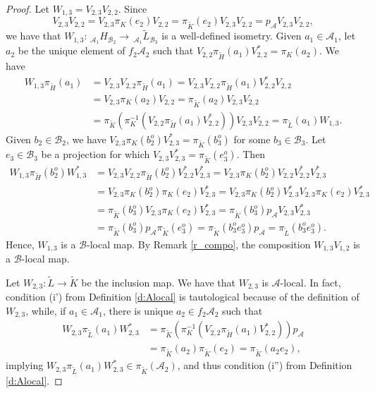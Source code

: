 \documentclass[11pt]{amsart}
\theoremstyle{definition}
\newcommand{\cl}[1]{\mathcal{#1}}
\providecommand{\wt}[1]{\widetilde{#1}}
\begin{document}
\begin{proof}
Let $W_{1,3} = V_{2,3}V_{2,2}$.
Since
$$V_{2,3}V_{2,2}=V_{2,3}\pi_{K}(e_2)V_{2,2}=\pi_{\wt{K}}(e_2)V_{2,3}V_{2,2}=p_\cl{A}V_{2,3}V_{2,2},$$
we have that 
$W_{1,3}: \, _{\cl{A}_1}H_{\cl{B}_2}\to \, _{\cl{A}_1}\wt{L}_{\cl{B}_3}$ is a well-defined isometry. 
Given $a_1\in \cl{A}_1$, 
let $a_2$ be the unique element of $f_2\cl{A}_2$ such that 
$V_{2,2}\pi_{\wt{H}}(a_1)V_{2,2}^*=\pi_{K}(a_2)$. We have 
\begin{align*}
W_{1,3}\pi_{\wt{H}}(a_1)
&=
V_{2,3}V_{2,2}\pi_{\wt{H}}(a_1)
=V_{2,3}V_{2,2}\pi_{\wt{H}}(a_1)V_{2,2}^*V_{2,2}\\
&=V_{2,3}\pi_{K}(a_2)V_{2,2}
=\pi_{\wt{K}}(a_2)V_{2,3}V_{2,2}\\
&=\pi_{\wt{K}}(\pi_K^{-1}(V_{2,2}\pi_{\wt{H}}(a_1)V_{2,2}^*))V_{2,3}V_{2,2}
=\pi_{\wt{L}}(a_1)W_{1,3}.
\end{align*}
Given $b_2\in \cl{B}_2$, we have $V_{2,3}\pi_{K}(b_2^o)V_{2,3}^*=\pi_{\wt{K}}(b_3^o)$ for some $b_3\in \cl{B}_3$. Let $e_3\in \cl{B}_3$ be a projection for which $V_{2,3}V_{2,3}^*=\pi_{\wt{K}}(e_3^o)$. Then
\begin{align*}
W_{1,3}\pi_{\wt{H}}(b_2^o)W_{1,3}^*
&=V_{2,3}V_{2,2}\pi_{\wt{H}}(b_2^o)V_{2,2}^*V_{2,3}^*
=V_{2,3}\pi_{K}(b_2^o)V_{2,2}V_{2,2}^*V_{2,3}^*\\
&=V_{2,3}\pi_{K}(b_2^o)\pi_{K}(e_2)V_{2,3}^*
=V_{2,3}\pi_{K}(b_2^o)V_{2,3}^*V_{2,3}\pi_{K}(e_2)V_{2,3}^*\\
&=\pi_{\wt{K}}(b_3^o)V_{2,3}\pi_{K}(e_2)V_{2,3}^*
=\pi_{\wt{K}}(b_3^o)p_\cl{A}V_{2,3}V_{2,3}^*\\
&=\pi_{\wt{K}}(b_3^o)p_\cl{A}\pi_{\wt{K}}(e_3^o)
=\pi_{\wt{K}}(b_3^oe_3^o)p_\cl{A}
=\pi_{\wt{L}}(b_3^oe_3^o).
\end{align*}
Hence, $W_{1,3}$ is a $\cl{B}$-local map.
By Remark \ref{r_compo}, the composition $W_{1,3} V_{1,2}$ is a 
$\cl{B}$-local map. 

Let $W_{2,3} : \wt{L} \to \wt{K}$ be the inclusion map. We have that 
$W_{2,3}$ is $\cl{A}$-local.
In fact, condition (i') from Definition \ref{d:Alocal} is tautological
because of the definition of $W_{2,3}$, while, 
if $a_1\in \cl{A}_1$, there is unique $a_2\in f_2\cl{A}_2$ such that
\begin{align*}
W_{2,3}\pi_{\wt{L}}(a_1)W_{2,3}^*
&=\pi_{\wt{K}}(\pi_K^{-1}(V_{2,2}\pi_{\wt{H}}(a_1)V_{2,2}^*))p_\cl{A}\\
&=\pi_{\wt{K}}(a_2)\pi_{\wt{K}}(e_2)
=\pi_{\wt{K}}(a_2e_2),
\end{align*}
implying $W_{2,3}\pi_{\wt{L}}(a_1)W_{2,3}^* \in \pi_{\wt{K}}(\cl{A}_2)$,
and thus condition (i'') from Definition \ref{d:Alocal}. 


\end{proof}
\end{document}
